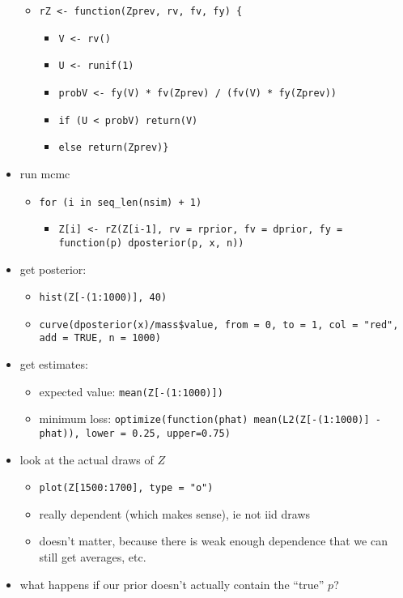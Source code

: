 \begin{itemize}
\begin{itemize}
\item \texttt{rZ <- function(Zprev, rv, fv, fy) \{}
\begin{itemize}
\item \texttt{V <- rv()}
\item \texttt{U <- runif(1)}
\item \texttt{probV <- fy(V) * fv(Zprev) / (fv(V) * fy(Zprev))}
\item \texttt{if (U < probV) return(V)}
\item \texttt{else return(Zprev)\}}
\end{itemize}
\end{itemize}
\item run mcmc
\begin{itemize}
\item \texttt{for (i in seq\_len(nsim) + 1)}
\begin{itemize}
\item \texttt{Z[i] <- rZ(Z[i-1], rv = rprior, fv = dprior, fy = function(p) dposterior(p, x, n))}
\end{itemize}
\end{itemize}
\item get posterior:
\begin{itemize}
\item \texttt{hist(Z[-(1:1000)], 40)}
\item \texttt{curve(dposterior(x)/mass\$value, from = 0, to = 1, col = "red", add = TRUE, n = 1000)}
\end{itemize}
\item get estimates:
\begin{itemize}
\item expected value: \texttt{mean(Z[-(1:1000)])}
\item minimum loss: \texttt{optimize(function(phat) mean(L2(Z[-(1:1000)] - phat)), lower = 0.25, upper=0.75)}
\end{itemize}
\item look at the actual draws of $Z$
\begin{itemize}
\item \texttt{plot(Z[1500:1700], type = "o")}
\item really dependent (which makes sense), ie not iid draws
\item doesn't matter, because there is weak enough dependence that we
         can still get averages, etc.
\end{itemize}
\item what happens if our prior doesn't actually contain the ``true'' $p$?

\end{itemize}
